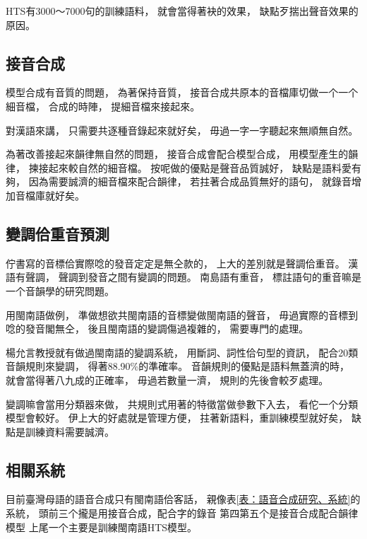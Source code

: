 HTS有3000～7000句的訓練語料，
就會當得著袂的效果，
缺點歹揣出聲音效果的原因。


\subsection{接音合成}
\label{小節：接音合成}
模型合成有音質的問題，
為著保持音質，
接音合成共原本的音檔庫切做一个一个細音檔，
合成的時陣，
提細音檔來接起來。

對漢語來講，
只需要共逐種音錄起來就好矣，
毋過一字一字聽起來無順無自然。

為著改善接起來韻律無自然的問題，
接音合成會配合模型合成，
用模型產生的韻律，
揀接起來較自然的細音檔。
按呢做的優點是聲音品質誠好，
缺點是語料愛有夠，
因為需要誠濟的細音檔來配合韻律，
若拄著合成品質無好的語句，
就錄音增加音檔庫就好矣。

\subsection{變調佮重音預測}
\label{小節：變調佮重音預測}
佇書寫的音標佮實際唸的發音定定是無仝款的，
上大的差別就是聲調佮重音。
漢語有聲調，
聲調到發音之間有變調的問題。
南島語有重音，
標註語句的重音嘛是一个音韻學的研究問題。

用閩南語做例，
準做想欲共閩南語的音標變做閩南語的聲音，
毋過實際的音標到唸的發音閣無仝，
後且閩南語的變調傷過複雜的，
需要專門的處理。

楊允言教授就有做過閩南語的變調系統\cite{iunn:台語變調系統實作研究}，
用斷詞、詞性佮句型的資訊，
配合20類音韻規則來變調，
得著88.90\%的準確率。
音韻規則的優點是語料無蓋濟的時，
就會當得著八九成的正確率，
毋過若數量一濟，
規則的先後會較歹處理。

變調嘛會當用分類器來做，
共規則式用著的特徵當做參數下入去，
看佗一个分類模型會較好。
伊上大的好處就是管理方便，
拄著新語料，重訓練模型就好矣，
缺點是訓練資料需要誠濟。

\subsection{相關系統}
\label{小節：語音合成相關系統}
目前臺灣母語的語音合成只有閩南語佮客話，
親像表\ref{表：語音合成研究、系統}的系統，
頭前三个攏是用接音合成，配合字的錄音
第四第五个是接音合成配合韻律模型
上尾一个主要是訓練閩南語HTS模型。

